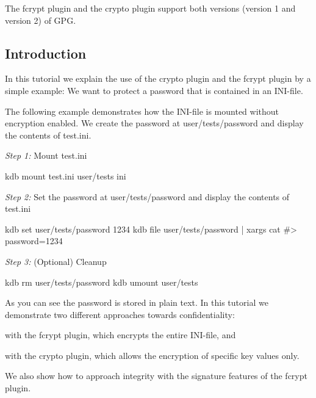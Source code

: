 The {\ttfamily fcrypt} plugin and the {\ttfamily crypto} plugin support both versions (version 1 and version 2) of G\+PG.

\subsection*{Introduction}

In this tutorial we explain the use of the {\ttfamily crypto} plugin and the {\ttfamily fcrypt} plugin by a simple example\+: We want to protect a password that is contained in an I\+N\+I-\/file.

The following example demonstrates how the I\+N\+I-\/file is mounted without encryption enabled. We create the password at {\ttfamily user/tests/password} and display the contents of {\ttfamily test.\+ini}.

{\itshape Step 1\+:} Mount {\ttfamily test.\+ini}


\begin{DoxyCode}
kdb mount test.ini user/tests ini
\end{DoxyCode}


{\itshape Step 2\+:} Set the password at {\ttfamily user/tests/password} and display the contents of {\ttfamily test.\+ini}


\begin{DoxyCode}
kdb set user/tests/password 1234
kdb file user/tests/password | xargs cat
#> password=1234
\end{DoxyCode}


{\itshape Step 3\+:} (Optional) Cleanup


\begin{DoxyCode}
kdb rm user/tests/password
kdb umount user/tests
\end{DoxyCode}


As you can see the password is stored in plain text. In this tutorial we demonstrate two different approaches towards confidentiality\+:


\begin{DoxyEnumerate}
\item with the {\ttfamily fcrypt} plugin, which encrypts the entire I\+N\+I-\/file, and
\item with the {\ttfamily crypto} plugin, which allows the encryption of specific key values only.
\end{DoxyEnumerate}

We also show how to approach integrity with the signature features of the {\ttfamily fcrypt} plugin.

